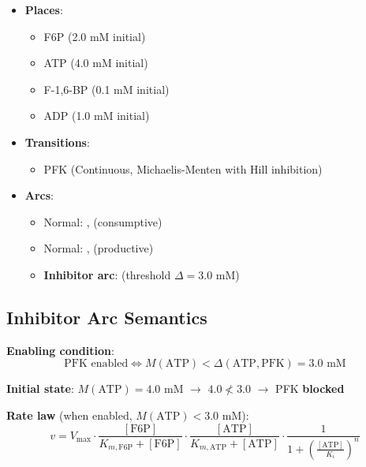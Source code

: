 \begin{itemize}
    \item \textbf{Places}:
    \begin{itemize}
        \item F6P (2.0 mM initial)
        \item ATP (4.0 mM initial)
        \item F-1,6-BP (0.1 mM initial)
        \item ADP (1.0 mM initial)
    \end{itemize}
    
    \item \textbf{Transitions}:
    \begin{itemize}
        \item PFK (Continuous, Michaelis-Menten with Hill inhibition)
    \end{itemize}
    
    \item \textbf{Arcs}:
    \begin{itemize}
        \item Normal: ,  (consumptive)
        \item Normal: ,  (productive)
        \item \textbf{Inhibitor arc}:  (threshold $\Delta = 3.0$ mM)
    \end{itemize}
\end{itemize}

\subsection{Inhibitor Arc Semantics}
\label{subsec:pfk-inhibitor}

\textbf{Enabling condition}:
\begin{equation}
\text{PFK enabled} \iff M(\text{ATP}) < \Delta(\text{ATP}, \text{PFK}) = 3.0 \text{ mM}
\end{equation}

\textbf{Initial state}: $M(\text{ATP}) = 4.0$ mM $\to$ $4.0 \not< 3.0$ $\to$ PFK \textbf{blocked}

\textbf{Rate law} (when enabled, $M(\text{ATP}) < 3.0$ mM):
\begin{equation}
v = V_{\max} \cdot \frac{[\text{F6P}]}{K_{m,\text{F6P}} + [\text{F6P}]} \cdot \frac{[\text{ATP}]}{K_{m,\text{ATP}} + [\text{ATP}]} \cdot \frac{1}{1 + \left(\frac{[\text{ATP}]}{K_i}\right)^n}
\end{equation}

